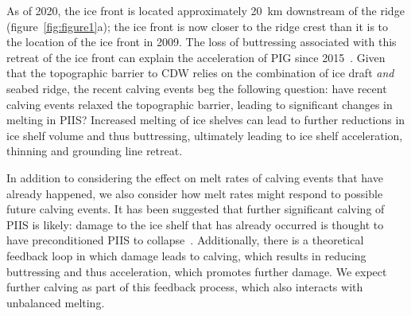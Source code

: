 \documentclass[draft]{agujournal2019}
\begin{document}
As of 2020, the ice front is located approximately 20~km downstream of the ridge (figure~\ref{fig:figure1}a); the ice front is now closer to the ridge crest than it is to the location of the ice front in 2009. The loss of buttressing associated with this retreat of the ice front can explain the acceleration of PIG since 2015~\cite{Joughin2021ScienceAdv}. Given that the topographic barrier to CDW relies on the combination of ice draft \textit{and} seabed ridge, the recent calving events beg the following question: have recent calving events relaxed the topographic barrier, leading to significant changes in melting in PIIS? Increased melting of ice shelves can lead to further reductions in ice shelf volume and thus buttressing, ultimately leading to ice shelf acceleration, thinning and grounding line retreat.

In addition to considering the effect on melt rates of calving events that have already happened, we also consider how melt rates might respond to possible future calving events. It has been suggested that further significant calving of PIIS is likely: damage to the ice shelf that has already occurred is thought to have preconditioned PIIS to collapse~\cite{Lhermitte2020PNAS}. Additionally, there is a theoretical feedback loop in which damage leads to calving, which results in reducing buttressing and thus acceleration, which promotes further damage. We expect further calving as part of this feedback process, which also interacts with unbalanced melting. 
\end{document}
